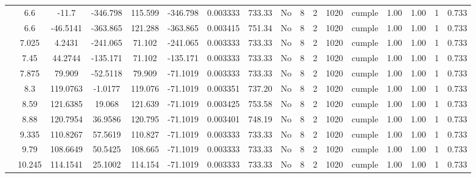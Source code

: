 \begin{table}[H]
{\begin{tabular}{|c|c|c|c|c|c|c|c|c|c|c|c|c|c|c|c|c|}
\cline{2-17}        & \cellcolor[rgb]{ .851,  .882,  .949}6.6 & -11.7 & -346.798 & 115.599 & -346.798 & 0.003333 & 733.33 & No  & 8   & 2   & 1020 & \cellcolor[rgb]{ .776,  .937,  .808}cumple & 1.00 & 1.00 & 1   & 0.733 \bigstrut\\
\cline{2-17}        & \cellcolor[rgb]{ .851,  .882,  .949}6.6 & -46.5141 & -363.865 & 121.288 & -363.865 & 0.003415 & 751.34 & No  & 8   & 2   & 1020 & \cellcolor[rgb]{ .776,  .937,  .808}cumple & 1.00 & 1.00 & 1   & 0.733 \bigstrut\\
\cline{2-17}        & 7.025 & 4.2431 & -241.065 & 71.102 & -241.065 & 0.003333 & 733.33 & No  & 8   & 2   & 1020 & \cellcolor[rgb]{ .776,  .937,  .808}cumple & 1.00 & 1.00 & 1   & 0.733 \bigstrut\\
\cline{2-17}        & 7.45 & 44.2744 & -135.171 & 71.102 & -135.171 & 0.003333 & 733.33 & No  & 8   & 2   & 1020 & \cellcolor[rgb]{ .776,  .937,  .808}cumple & 1.00 & 1.00 & 1   & 0.733 \bigstrut\\
\cline{2-17}        & 7.875 & 79.909 & -52.5118 & 79.909 & -71.1019 & 0.003333 & 733.33 & No  & 8   & 2   & 1020 & \cellcolor[rgb]{ .776,  .937,  .808}cumple & 1.00 & 1.00 & 1   & 0.733 \bigstrut\\
\cline{2-17}        & 8.3 & 119.0763 & -1.0177 & 119.076 & -71.1019 & 0.003351 & 737.20 & No  & 8   & 2   & 1020 & \cellcolor[rgb]{ .776,  .937,  .808}cumple & 1.00 & 1.00 & 1   & 0.733 \bigstrut\\
\cline{2-17}        & 8.59 & 121.6385 & 19.068 & 121.639 & -71.1019 & 0.003425 & 753.58 & No  & 8   & 2   & 1020 & \cellcolor[rgb]{ .776,  .937,  .808}cumple & 1.00 & 1.00 & 1   & 0.733 \bigstrut\\
\cline{2-17}        & 8.88 & 120.7954 & 36.9586 & 120.795 & -71.1019 & 0.003401 & 748.19 & No  & 8   & 2   & 1020 & \cellcolor[rgb]{ .776,  .937,  .808}cumple & 1.00 & 1.00 & 1   & 0.733 \bigstrut\\
\cline{2-17}        & 9.335 & 110.8267 & 57.5619 & 110.827 & -71.1019 & 0.003333 & 733.33 & No  & 8   & 2   & 1020 & \cellcolor[rgb]{ .776,  .937,  .808}cumple & 1.00 & 1.00 & 1   & 0.733 \bigstrut\\
\cline{2-17}        & 9.79 & 108.6649 & 50.5425 & 108.665 & -71.1019 & 0.003333 & 733.33 & No  & 8   & 2   & 1020 & \cellcolor[rgb]{ .776,  .937,  .808}cumple & 1.00 & 1.00 & 1   & 0.733 \bigstrut\\
\cline{2-17}        & 10.245 & 114.1541 & 25.1002 & 114.154 & -71.1019 & 0.003333 & 733.33 & No  & 8   & 2   & 1020 & \cellcolor[rgb]{ .776,  .937,  .808}cumple & 1.00 & 1.00 & 1   & 0.733 \bigstrut\\

\end{tabular}}
\end{table}
